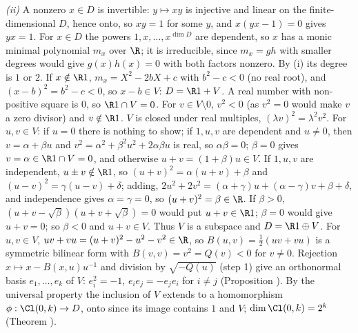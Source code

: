 \emph{(ii)} A nonzero $x \in D$ is invertible: $y \mapsto xy$ is injective and linear on the finite-dimensional $D$, hence onto, so $xy = 1$ for some $y$, and $x(yx - 1) = 0$ gives $yx = 1$. For $x \in D$ the powers $1, x, \dots, x^{\dim D}$ are dependent, so $x$ has a monic minimal polynomial $m_{x}$ over $\R$; it is irreducible, since $m_{x} = gh$ with smaller degrees would give $g(x)h(x) = 0$ with both factors nonzero. By (i) its degree is $1$ or $2$. If $x \notin \R 1$, $m_{x} = X^{2} - 2bX + c$ with $b^{2} - c < 0$ (no real root), and $(x - b)^{2} = b^{2} - c < 0$, so $x - b \in V$: $D = \R 1 + V$. A real number with non-positive square is $0$, so $\R 1 \cap V = 0$. For $v \in V \setminus 0$, $v^{2} < 0$ (as $v^{2} = 0$ would make $v$ a zero divisor) and $v \notin \R 1$. $V$ is closed under real multiples, $(\lambda v)^{2} = \lambda^{2}v^{2}$. For $u, v \in V$: if $u = 0$ there is nothing to show; if $1, u, v$ are dependent and $u \ne 0$, then $v = \alpha + \beta u$ and $v^{2} = \alpha^{2} + \beta^{2}u^{2} + 2\alpha\beta u$ is real, so $\alpha\beta = 0$; $\beta = 0$ gives $v = \alpha \in \R 1 \cap V = 0$, and otherwise $u + v = (1 + \beta)u \in V$. If $1, u, v$ are independent, $u \pm v \notin \R 1$, so $(u + v)^{2} = \alpha(u + v) + \beta$ and $(u - v)^{2} = \gamma(u - v) + \delta$; adding, $2u^{2} + 2v^{2} = (\alpha + \gamma)u + (\alpha - \gamma)v + \beta + \delta$, and independence gives $\alpha = \gamma = 0$, so $(u + v)^{2} = \beta \in \R$. If $\beta > 0$, $(u + v - \sqrt{\beta})(u + v + \sqrt{\beta}) = 0$ would put $u + v \in \R 1$; $\beta = 0$ would give $u + v = 0$; so $\beta < 0$ and $u + v \in V$. Thus $V$ is a subspace and $D = \R 1 \oplus V$. For $u, v \in V$, $uv + vu = (u + v)^{2} - u^{2} - v^{2} \in \R$, so $B(u, v) = \tfrac12(uv + vu)$ is a symmetric bilinear form with $B(v, v) = v^{2} = Q(v) < 0$ for $v \ne 0$. Rejection $x \mapsto x - B(x, u)u^{-1}$ and division by $\sqrt{-Q(u)}$ (step 1) give an orthonormal basis $e_{1}, \dots, e_{k}$ of $V$: $e_{i}^{2} = -1$, $e_{i}e_{j} = -e_{j}e_{i}$ for $i \ne j$ (Proposition ). By the universal property the inclusion of $V$ extends to a homomorphism $\phi: \Cl(0,k) \to D$, onto since its image contains $1$ and $V$; $\dim \Cl(0,k) = 2^{k}$ (Theorem ).

